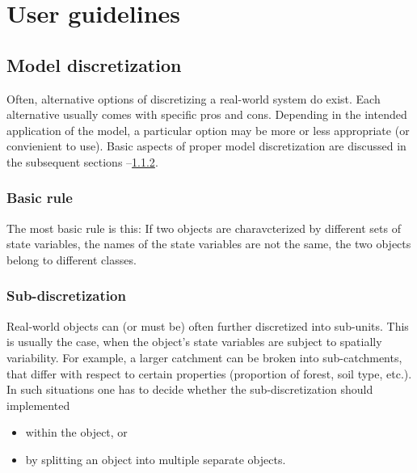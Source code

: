 \chapter{User guidelines} \label{chap:guidelines}
\renewcommand{\tabdir}{chapters/guidelines/tab}
\renewcommand{\figdir}{chapters/guidelines/fig}

\section{Model discretization} \label{sec:guidelines-discretization}

Often, alternative options of discretizing a real-world system do exist. Each alternative usually comes with specific pros and cons. Depending in the intended application of the model, a particular option may be more or less appropriate (or convienient to use). Basic aspects of proper model discretization are discussed in the subsequent sections --\ref{sec:guidelines-discretization-sub}.

\subsection{Basic rule} \label{sec:guidelines-discretization-basic}

The most basic rule is this: If two objects are charavcterized by different sets of state variables, \ie{} the names of the state variables are not the same, the two objects belong to different classes.

\subsection{Sub-discretization} \label{sec:guidelines-discretization-sub}

Real-world objects can (or must be) often further discretized into sub-units. This is usually the case, when the object's state variables are subject to spatially variability. For example, a larger catchment can be broken into sub-catchments, that differ with respect to certain properties (proportion of forest, soil type, etc.). In such situations one has to decide whether the sub-discretization should implemented
\begin{itemize}
  \item within the object, or
  \item by splitting an object into multiple separate objects.
\end{itemize}

